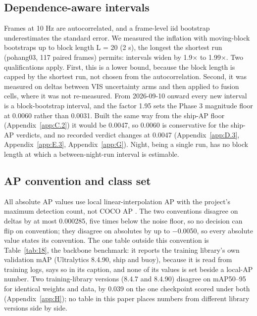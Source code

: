 \documentclass[journal,onecolumn]{IEEEtran}
\begin{document}
\subsection{Dependence-aware intervals}\label{app:C.3}
Frames at 10 Hz are autocorrelated, and a frame-level iid bootstrap underestimates the standard error. We measured the inflation with moving-block bootstraps \cite{kunsch1989the} up to block length L = 20 (2 s), the longest the shortest run (pohang03, 117 paired frames) permits: intervals widen by 1.9$\times$ to 1.99$\times$. Two qualifications apply. First, this is a lower bound, because the block length is capped by the shortest run, not chosen from the autocorrelation. Second, it was measured on deltas between VIS uncertainty arms and then applied to fusion cells, where it was not re-measured. From 2026-09-10 onward every new interval is a block-bootstrap interval, and the factor 1.95 sets the Phase 3 magnitude floor at 0.0060 rather than 0.0031. Built the same way from the ship-AP floor (Appendix~\ref{app:C.2}) it would be 0.0047, so 0.0060 is conservative for the ship-AP verdicts, and no recorded verdict changes at 0.0047 (Appendix~\ref{app:D.3}, Appendix~\ref{app:E.3}, Appendix~\ref{app:G}). Night, being a single run, has no block length at which a between-night-run interval is estimable.

\subsection{AP convention and class set}\label{app:C.4}
All absolute AP values use local linear-interpolation AP with the project's maximum detection count, not COCO AP \cite{lin2014microsoft}. The two conventions disagree on deltas by at most 0.000285, five times below the noise floor, so no decision can flip on convention; they disagree on absolutes by up to $-$0.0050, so every absolute value states its convention. The one table outside this convention is Table~\ref{tab:18}, the backbone benchmark: it reports the training library's own validation mAP (Ultralytics 8.4.90, ship and buoy), because it is read from training logs, says so in its caption, and none of its values is set beside a local-AP number. Two training-library versions (8.4.7 and 8.4.90) disagree on mAP50--95 for identical weights and data, by 0.039 on the one checkpoint scored under both (Appendix~\ref{app:H}); no table in this paper places numbers from different library versions side by side.
\end{document}
